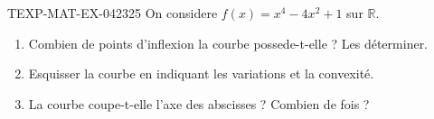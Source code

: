 \begin{exercice}{TEXP-MAT-EX-042}{3}{25}
On considere $f(x) = x^4 - 4x^2 + 1$ sur $\mathbb{R}$.
\begin{enumerate}
  \item Combien de points d'inflexion la courbe possede-t-elle ? Les déterminer.
  \item Esquisser la courbe en indiquant les variations et la convexité.
  \item La courbe coupe-t-elle l'axe des abscisses ? Combien de fois ?
\end{enumerate}

\end{exercice}

